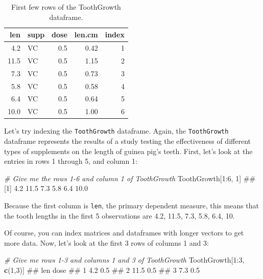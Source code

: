 \documentclass[]{book}
\newenvironment{Shaded}{\begin{snugshade}}{\end{snugshade}}
\newcommand{\KeywordTok}[1]{\textcolor[rgb]{0.13,0.29,0.53}{\textbf{{#1}}}}
\newcommand{\DecValTok}[1]{\textcolor[rgb]{0.00,0.00,0.81}{{#1}}}
\newcommand{\CommentTok}[1]{\textcolor[rgb]{0.56,0.35,0.01}{\textit{{#1}}}}
\newcommand{\NormalTok}[1]{{#1}}
\theoremstyle{definition}
\theoremstyle{definition}
\theoremstyle{remark}
\begin{document}
\begin{table}

\caption{\label{tab:unnamed-chunk-193}First few rows of the ToothGrowth dataframe.}
\centering
\begin{tabular}[t]{r|l|r|r|r}
\hline
len & supp & dose & len.cm & index\\
\hline
4.2 & VC & 0.5 & 0.42 & 1\\
\hline
11.5 & VC & 0.5 & 1.15 & 2\\
\hline
7.3 & VC & 0.5 & 0.73 & 3\\
\hline
5.8 & VC & 0.5 & 0.58 & 4\\
\hline
6.4 & VC & 0.5 & 0.64 & 5\\
\hline
10.0 & VC & 0.5 & 1.00 & 6\\
\hline
\end{tabular}
\end{table}

Let's try indexing the \texttt{ToothGrowth} dataframe. Again, the
\texttt{ToothGrowth} dataframe represents the results of a study testing
the effectiveness of different types of supplements on the length of
guinea pig's teeth. First, let's look at the entries in rows 1 through
5, and column 1:

\begin{Shaded}
\begin{Highlighting}[]
\CommentTok{# Give me the rows 1-6 and column 1 of ToothGrowth}
\NormalTok{ToothGrowth[}\DecValTok{1}\NormalTok{:}\DecValTok{6}\NormalTok{, }\DecValTok{1}\NormalTok{]}
\NormalTok{## [1]  4.2 11.5  7.3  5.8  6.4 10.0}
\end{Highlighting}
\end{Shaded}

Because the first column is \texttt{len}, the primary dependent measure,
this means that the tooth lengths in the first 5 observations are 4.2,
11.5, 7.3, 5.8, 6.4, 10.

Of course, you can index matrices and dataframes with longer vectors to
get more data. Now, let's look at the first 3 rows of columns 1 and 3:

\begin{Shaded}
\begin{Highlighting}[]
\CommentTok{# Give me rows 1-3 and columns 1 and 3 of ToothGrowth}
\NormalTok{ToothGrowth[}\DecValTok{1}\NormalTok{:}\DecValTok{3}\NormalTok{, }\KeywordTok{c}\NormalTok{(}\DecValTok{1}\NormalTok{,}\DecValTok{3}\NormalTok{)]}
\NormalTok{##    len dose}
\NormalTok{## 1  4.2  0.5}
\NormalTok{## 2 11.5  0.5}
\NormalTok{## 3  7.3  0.5}
\end{Highlighting}
\end{Shaded}
\end{document}
